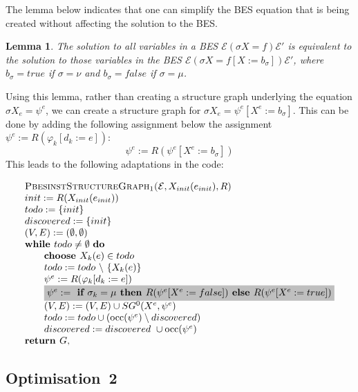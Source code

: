 \documentclass{article}
\newtheorem{lemma}[theorem]{Lemma}
\begin{document}
The lemma below indicates that one can simplify the BES equation that is being created
without affecting the solution to the BES. 
\begin{lemma}
The solution to all variables in a BES $\mathcal{E} (\sigma X = f) \mathcal{E}'$ is 
equivalent to the solution to those variables in the BES
$\mathcal{E} (\sigma X = f[X := b_\sigma]) \mathcal{E}'$, where
$b_\sigma = true$ if $\sigma = \nu$ and $b_\sigma = false$ if $\sigma = \mu$.
\end{lemma}
Using this lemma, rather than creating a structure graph underlying the
equation $\sigma X_e = \psi^e$, we can create a structure graph
for $\sigma X_e = \psi^e[X^e := b_\sigma]$.
This can be done by adding the following assignment below the assignment
$\psi^e := R(\varphi_k[d_k := e])$:
\[
\psi^e := R(\psi^e[X^e := b_\sigma])
\]
This leads to the following adaptations in the code:

\begin{equation*}
\begin{array}{l}
\textsc{PbesinstStructureGraph$_1$(}\mathcal{E}, X_{init}(e_{init}), R) \\ 
init:=R(X_{init}(e_{init})) \\
todo:=\{init\} \\
discovered:=\{init\} \\
(V,E) :=(\emptyset ,\emptyset ) \\ 
\text{\textbf{while }}todo\neq \emptyset \text{ \textbf{do}} \\ 
\qquad \text{\textbf{choose }}X_{k}(e)\in todo \\ 
\qquad todo:=todo\ \backslash \ \{X_{k}(e)\} \\
\qquad \psi ^{e}:=R(\varphi _{k}[d_{k}:=e]) \\ 
\qquad \colorbox{lightgray}{$%
\psi^e := \textbf{ if } \sigma_k = \mu \textbf{ then } R(\psi^e[X^e := false]) \textbf{ else }  R(\psi^e[X^e := true]) $}\\
\qquad (V,E) := (V,E) \cup SG^{0}(X^{e},\psi ^{e}) \\ 
\qquad todo:=todo\cup (\mathrm{occ}(\psi ^{e})\setminus discovered) \\
\qquad discovered:=discovered\ \cup \mathrm{occ}(\psi ^{e}) \\
\text{\textbf{return }}G,%
\end{array}%
\end{equation*}%


\subsection{Optimisation~2}
\end{document}
